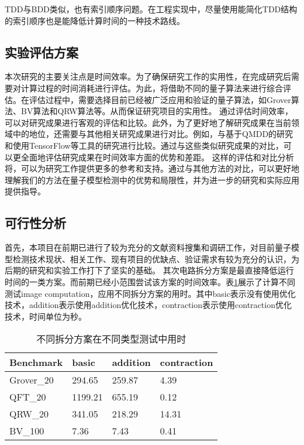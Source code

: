 TDD与BDD类似，也有索引顺序问题。在工程实现中，尽量使用能简化TDD结构的索引顺序也是能降低计算时间的一种技术路线。
\subsection{实验评估方案}
本次研究的主要关注点是时间效率。为了确保研究工作的实用性，在完成研究后需要对计算过程的时间消耗进行评估。为此，将借助不同的量子算法来进行综合评估。在评估过程中，需要选择目前已经被广泛应用和验证的量子算法，如Grover算法、BV算法和QRW算法等。从而保证研究项目的实用性。
通过评估时间效率，可以对研究成果进行客观的评估和比较。此外，为了更好地了解研究成果在当前领域中的地位，还需要与其他相关研究成果进行对比。例如，与基于QMDD的研究和使用TensorFlow等工具的研究进行比较。通过与这些类似研究成果的对比，可以更全面地评估研究成果在时间效率方面的优势和差距。
这样的评估和对比分析将，可以为研究工作提供更多的参考和支持。通过与其他方法的对比，可以更好地理解我们的方法在量子模型检测中的优势和局限性，并为进一步的研究和实际应用提供指导。
\subsection{可行性分析}
首先，本项目在前期已进行了较为充分的文献资料搜集和调研工作，对目前量子模型检测技术现状、相关工作、现有项目的优缺点、验证需求有较为充分的认识，为后期的研究和实验工作打下了坚实的基础。
其次电路拆分方案是最直接降低运行时间的一类方案。而前期已经小范围尝试该方案的时间效率。表\ref{table:split}展示了计算不同测试image computation，应用不同拆分方案的用时。其中basic表示没有使用优化技术，addition表示使用addition优化技术，contraction表示使用contraction优化技术，时间单位为秒。

\begin{table}[!htbp]
	\centering
	\begin{tabular}{@{}llll@{}}
	\toprule
	Benchmark  & basic   & addition & contraction \\ \midrule
	Grover\_20 & 294.65  & 259.87   & 4.39        \\
	QFT\_20    & 1199.21 & 655.19   & 0.12        \\
	QRW\_20    & 341.05  & 218.29   & 14.31       \\
	BV\_100    & 7.36    & 7.43     & 0.41        \\ \bottomrule
	\end{tabular}
	\caption{不同拆分方案在不同类型测试中用时}
	\label{table:split}
\end{table}

